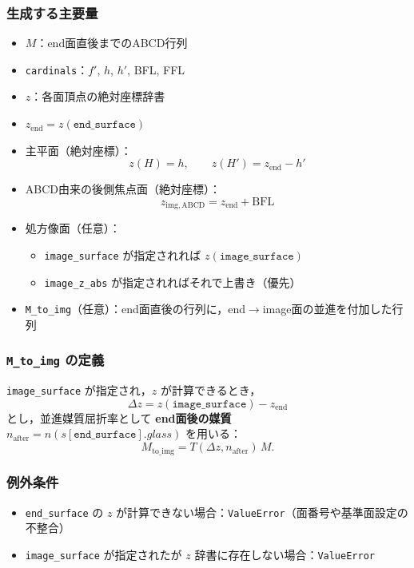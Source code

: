 \documentclass[a4paper,11pt]{jsarticle} %
\begin{document}
\subsubsection{生成する主要量}
\begin{itemize}
  \item $M$：end面直後までのABCD行列
  \item \texttt{cardinals}：$f'$, $h$, $h'$, BFL, FFL
  \item $z$：各面頂点の絶対座標辞書
  \item $z_{\mathrm{end}}=z(\texttt{end\_surface})$
  \item 主平面（絶対座標）：
    \[
    z(H)=h,\qquad z(H')=z_{\mathrm{end}}-h'
    \]
  \item ABCD由来の後側焦点面（絶対座標）：
    \[
    z_{\mathrm{img,ABCD}}=z_{\mathrm{end}}+\mathrm{BFL}
    \]
  \item 処方像面（任意）：
    \begin{itemize}
      \item \texttt{image\_surface} が指定されれば $z(\texttt{image\_surface})$
      \item \texttt{image\_z\_abs} が指定されればそれで上書き（優先）
    \end{itemize}
  \item \texttt{M\_to\_img}（任意）：end面直後の行列に，end$\rightarrow$image面の並進を付加した行列
\end{itemize}

\subsubsection{\texttt{M\_to\_img} の定義}
\texttt{image\_surface} が指定され，$z$ が計算できるとき，
\[
\Delta z = z(\texttt{image\_surface}) - z_{\mathrm{end}}
\]
とし，並進媒質屈折率として \textbf{end面後の媒質} $n_{\mathrm{after}}=n(s[\texttt{end\_surface}].glass)$ を用いる：
\[
M_{\mathrm{to\_img}} = T(\Delta z, n_{\mathrm{after}})\, M.
\]

\subsubsection{例外条件}
\begin{itemize}
  \item \texttt{end\_surface} の $z$ が計算できない場合：\texttt{ValueError}（面番号や基準面設定の不整合）
  \item \texttt{image\_surface} が指定されたが $z$ 辞書に存在しない場合：\texttt{ValueError}
\end{itemize}
\end{document}
